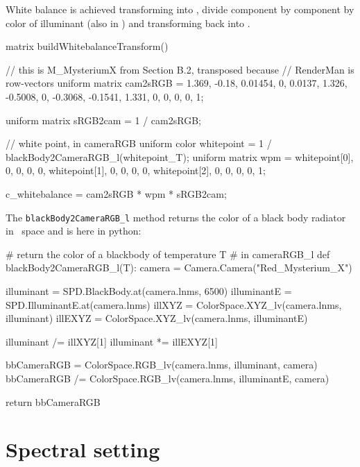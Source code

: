 White balance is achieved transforming into \camRGBl, divide component by
component by color of illuminant (also in \camRGBl) and transforming back into
\sRGBl.

\begin{rslcode}
matrix buildWhitebalanceTransform()
{
    // this is M\_MysteriumX from Section B.2, transposed because
    // RenderMan is row-vectors
    uniform matrix cam2sRGB = {  1.369,  -0.18,   0.01454, 0,
                                 0.0137,  1.326, -0.5008,  0,
                                -0.3068, -0.1541, 1.331,   0,
                                 0,       0,      0,       1};

    uniform matrix sRGB2cam = 1 / cam2sRGB;

    // white point, in cameraRGB
    uniform color whitepoint = 1 / blackBody2CameraRGB_l(whitepoint_T);
    uniform matrix wpm = {  whitepoint[0], 0,  0,  0,
                            0,  whitepoint[1], 0,  0,
                            0,  0,  whitepoint[2], 0,
                            0,  0,  0,             1};

    c_whitebalance = cam2sRGB * wpm * sRGB2cam;
}
\end{rslcode}

The \Verb|blackBody2CameraRGB_l| method returns the color of a black body
radiator in \camRGBl\ space and is here in python:

\begin{pythoncode}
# return the color of a blackbody of temperature T
# in cameraRGB\_l
def blackBody2CameraRGB_l(T):
    camera = Camera.Camera("Red_Mysterium_X")

    illuminant = SPD.BlackBody.at(camera.lnms, 6500)
    illuminantE = SPD.IlluminantE.at(camera.lnms)
    illXYZ = ColorSpace.XYZ_lv(camera.lnms, illuminant)
    illEXYZ = ColorSpace.XYZ_lv(camera.lnms, illuminantE)

    illuminant /= illXYZ[1]
    illuminant *= illEXYZ[1]

    bbCameraRGB = ColorSpace.RGB_lv(camera.lnms, illuminant, camera)
    bbCameraRGB /=  ColorSpace.RGB_lv(camera.lnms, illuminantE, camera)

    return bbCameraRGB
\end{pythoncode}



\section{Spectral setting}

